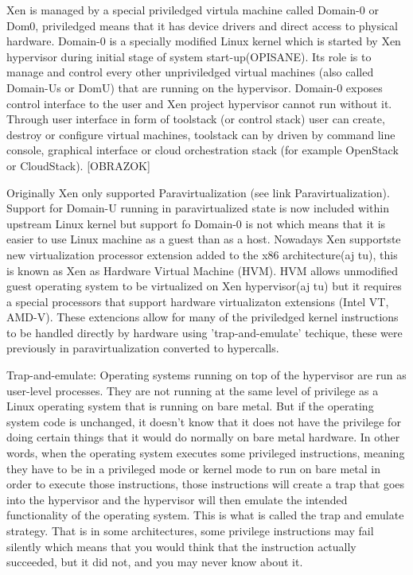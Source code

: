 \begin{itemize}
Xen is managed by a special priviledged virtula machine called Domain-0 or Dom0, priviledged means that it has device drivers and direct access to physical hardware. Domain-0 is a specially modified Linux kernel which is started by Xen hypervisor during initial stage of system start-up(OPISANE). Its role is to manage and control every other unpriviledged virtual machines (also called Domain-Us or DomU) that are running on the hypervisor. Domain-0 exposes control interface to the user and Xen project hypervisor cannot run without it. Through user interface in form of toolstack (or control stack) user can create, destroy or configure virtual machines, toolstack can by driven by command line console, graphical interface or cloud orchestration stack (for example OpenStack or CloudStack). [OBRAZOK]

Originally Xen only supported Paravirtualization (see link Paravirtualization). Support for Domain-U running in paravirtualized state is now included within upstream Linux kernel but support fo Domain-0 is not which means that it is easier to use Linux machine as a guest than as a host. Nowadays Xen supportste new virtualization processor extension added to the x86 architecture(aj tu), this is known as Xen as Hardware Virtual Machine (HVM). HVM allows unmodified guest operating system to be virtualized on Xen hypervisor(aj tu) but it requires a special processors that support hardware virtualizaton extensions (Intel VT, AMD-V). These extencions allow for many of the priviledged kernel instructions to be handled directly by hardware using 'trap-and-emulate' techique, these were previously in paravirtualization converted to hypercalls.

Trap-and-emulate: Operating systems running on top of the hypervisor are run as user-level processes. They are not running at the same level of privilege as a Linux operating system that is running on bare metal. But if the operating system code is unchanged, it doesn’t know that it does not have the privilege for doing certain things that it would do normally on bare metal hardware. In other words, when the operating system executes some privileged instructions, meaning they have to be in a privileged mode or kernel mode to run on bare metal in order to execute those instructions, those instructions will create a trap that goes into the hypervisor and the hypervisor will then emulate the intended functionality of the operating system. This is what is called the trap and emulate strategy. That is in some architectures, some privilege instructions may fail silently which means that you would think that the instruction actually succeeded, but it did not, and you may never know about it.


\end{itemize}
